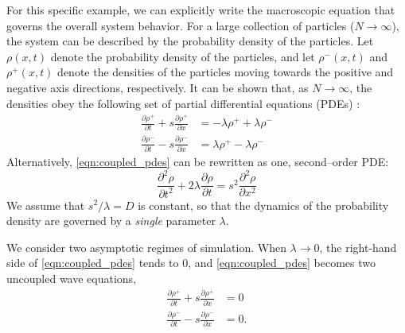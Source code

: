 \documentclass[prl, reprint, final, showkeys]{revtex4-1}
\begin{document}

For this specific example, we can explicitly write the macroscopic equation that governs the overall system behavior.
%
For a large collection of particles ($N \rightarrow \infty$), the system can be described by the probability density of the particles.
%
Let $\rho(x, t)$ denote the probability density of the particles, and let $\rho^-(x, t)$ and $\rho^+(x, t)$ denote the densities of the particles moving towards the positive and negative axis directions, respectively.
%
It can be shown that, as $N \rightarrow \infty$, the densities obey the following set of partial differential equations (PDEs) \cite{othmer2000diffusion}:
\begin{equation} \label{eqn:coupled_pdes}
\begin{aligned}
\frac{\partial \rho^+}{\partial t} + s \frac{\partial \rho^+}{\partial x} & = -\lambda \rho^+ +\lambda \rho^- \\
\frac{\partial \rho^-}{\partial t} - s \frac{\partial \rho^-}{\partial x} & = \lambda \rho^+ -\lambda \rho^- 
\end{aligned}
\end{equation}
%
Alternatively, \eqref{eqn:coupled_pdes} can be rewritten as one, second--order PDE:
\begin{equation} \label{eq:second_order_pde}
\frac{\partial^2 \rho}{\partial t^2} + 2 \lambda \frac{\partial \rho}{\partial t} = s^2 \frac{\partial ^2 \rho}{\partial x^2}
\end{equation}
%
We assume that $s^2/\lambda = D$ is constant, so that the dynamics of the probability density are governed by a {\em single} parameter $\lambda$.


We consider two asymptotic regimes of simulation.
%
When $\lambda \rightarrow 0$, the right-hand side of \eqref{eqn:coupled_pdes} tends to 0, and \eqref{eqn:coupled_pdes} becomes two uncoupled wave equations,
\begin{equation}
\begin{aligned}
\frac{\partial \rho^+}{\partial t} + s \frac{\partial \rho^+}{\partial x} & = 0 \\
\frac{\partial \rho^-}{\partial t} - s \frac{\partial \rho^-}{\partial x} & = 0.
\end{aligned}
\end{equation}
\end{document}
